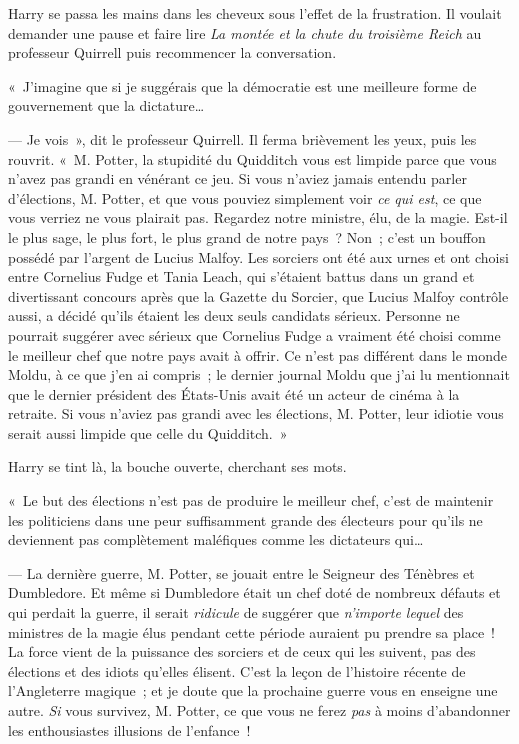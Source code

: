 Harry se passa les mains dans les cheveux sous l'effet de la frustration.
Il voulait demander une pause et faire lire \emph{La montée et la chute du troisième Reich} au professeur Quirrell puis recommencer la conversation.

«~J'imagine que si je suggérais que la démocratie est une meilleure forme de gouvernement que la dictature…

--- Je vois~», dit le professeur Quirrell.
Il ferma brièvement les yeux, puis les rouvrit.
«~M. Potter, la stupidité du Quidditch vous est limpide parce que vous n'avez pas grandi en vénérant ce jeu.
Si vous n'aviez jamais entendu parler d'élections, M. Potter, et que vous pouviez simplement voir \emph{ce qui est}, ce que vous verriez ne vous plairait pas.
Regardez notre ministre, élu, de la magie.
Est-il le plus sage, le plus fort, le plus grand de notre pays~?
Non~; c'est un bouffon possédé par l'argent de Lucius Malfoy.
Les sorciers ont été aux urnes et ont choisi entre Cornelius Fudge et Tania Leach, qui s'étaient battus dans un grand et divertissant concours après que la Gazette du Sorcier, que Lucius Malfoy contrôle aussi, a décidé qu'ils étaient les deux seuls candidats sérieux.
Personne ne pourrait suggérer avec sérieux que Cornelius Fudge a vraiment été choisi comme le meilleur chef que notre pays avait à offrir.
Ce n'est pas différent dans le monde Moldu, à ce que j'en ai compris~; le dernier journal Moldu que j'ai lu mentionnait que le dernier président des États-Unis avait été un acteur de cinéma à la retraite.
Si vous n'aviez pas grandi avec les élections, M. Potter, leur idiotie vous serait aussi limpide que celle du Quidditch.~»

Harry se tint là, la bouche ouverte, cherchant ses mots.

«~Le but des élections n'est pas de produire le meilleur chef, c'est de maintenir les politiciens dans une peur suffisamment grande des électeurs pour qu'ils ne deviennent pas complètement maléfiques comme les dictateurs qui…

--- La dernière guerre, M. Potter, se jouait entre le Seigneur des Ténèbres et Dumbledore.
Et même si Dumbledore était un chef doté de nombreux défauts et qui perdait la guerre, il serait \emph{ridicule} de suggérer que \emph{n'importe lequel} des ministres de la magie élus pendant cette période auraient pu prendre sa place~!
La force vient de la puissance des sorciers et de ceux qui les suivent, pas des élections et des idiots qu'elles élisent.
C'est la leçon de l'histoire récente de l'Angleterre magique~; et je doute que la prochaine guerre vous en enseigne une autre.
\emph{Si} vous survivez, M. Potter, ce que vous ne ferez \emph{pas} à moins d'abandonner les enthousiastes illusions de l'enfance~!

